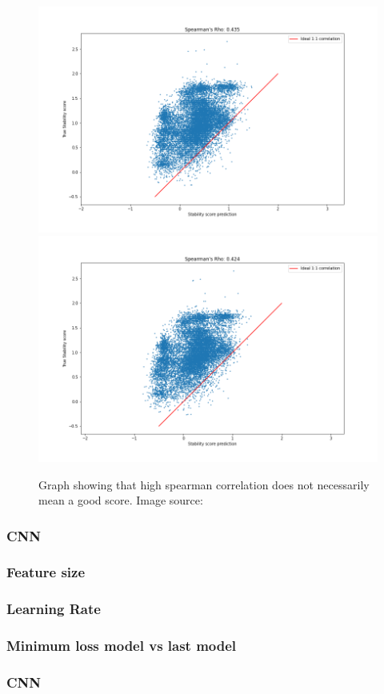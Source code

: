 \begin{figure}[!ht]
  \centering
  \includegraphics[width=0.4\linewidth]{latex/imgs/spearman_1_layer_with_schedule_256_final.png}
  \includegraphics[width=0.4\linewidth]{latex/imgs/spearman_1_layer_with_schedule_256_minloss.png}
  \caption{Graph showing that high spearman correlation does not necessarily mean a good score. Image source:\cite{spearman}}
\end{figure}
\newpage
\subsubsection{CNN}


\subsubsection{Feature size}


\subsubsection{Learning Rate}


\subsubsection{Minimum loss model vs last model} %
%

\subsubsection{CNN}

